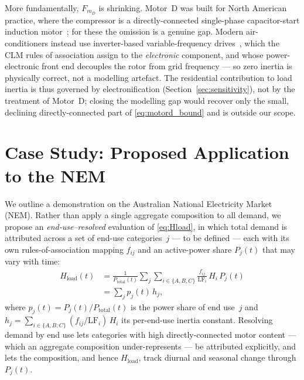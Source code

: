 \documentclass[journal]{IEEEtran}
\begin{document}
More fundamentally, $F_{m_D}$ is shrinking. Motor~D was built for North American
practice, where the compressor is a directly-connected single-phase
capacitor-start induction motor~\cite{CIGRE_CSE_N20}; for these the omission is a
genuine gap. Modern air-conditioners instead use inverter-based
variable-frequency drives~\cite{CIGRE_CSE_N20}, which the CLM rules of association
assign to the \emph{electronic} component, and whose power-electronic front end
decouples the rotor from grid frequency --- so zero inertia is physically
correct, not a modelling artefact. The residential contribution to load inertia
is thus governed by electronification (Section~\ref{sec:sensitivity}), not by the
treatment of Motor~D; closing the modelling gap would recover only the small,
declining directly-connected part of \eqref{eq:motord_bound} and is outside our
scope.


\section{Case Study: Proposed Application to the NEM}
\label{sec:casestudy}
We outline a demonstration on the Australian National Electricity Market (NEM).
Rather than apply a single aggregate composition to all demand, we propose an
\emph{end-use--resolved} evaluation of \eqref{eq:Hload}, in which total demand is
attributed across a set of end-use categories~$j$ --- to be defined --- each with
its own rules-of-association mapping $f_{ij}$ and an active-power share $P_j(t)$
that may vary with time:
\begin{equation}
\begin{aligned}
  H_{\mathrm{load}}(t)
   &= \frac{1}{P_{\mathrm{total}}(t)}\sum_{j}\sum_{i\in\{A,B,C\}}
        \frac{f_{ij}}{\mathrm{LF}_i}\,H_i\,P_j(t)\\[2pt]
   &= \sum_j p_j(t)\,h_j,
\end{aligned}
  \label{eq:Hload_j}
\end{equation}
where $p_j(t)=P_j(t)/P_{\mathrm{total}}(t)$ is the power share of end use~$j$ and
$h_j=\sum_{i\in\{A,B,C\}}(f_{ij}/\mathrm{LF}_i)\,H_i$ its per-end-use inertia
constant. Resolving demand by end use lets
categories with high directly-connected motor content --- which an aggregate
composition under-represents --- be attributed explicitly, and lets the
composition, and hence $H_{\mathrm{load}}$, track diurnal and seasonal change
through $P_j(t)$.
\end{document}
